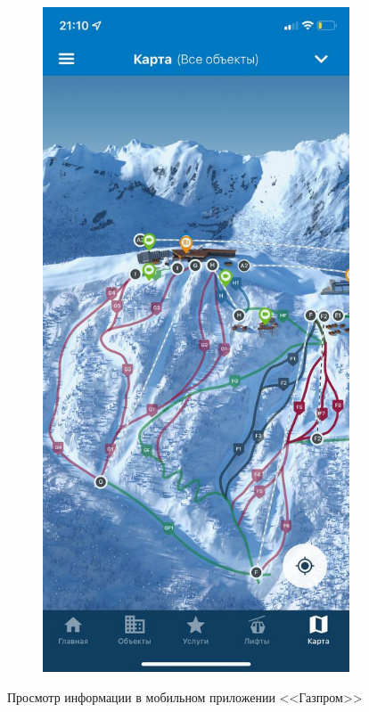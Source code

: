 \begin{figure}[h!]
\begin{center}
\begin{subfigure}{.33\textwidth}
		\label{img:glift}
		\captionsetup{justification=centering}
		\caption{}
	\end{subfigure}%
	\begin{subfigure}{.33\textwidth}
		\centering
		\includegraphics[width=.95\linewidth]{../imgs/analogue_apps/gmap.png}
		\label{img:gmap}
		\captionsetup{justification=centering}
		\caption{}
	\end{subfigure}
	\captionsetup{justification=centering}
	\caption{Просмотр информации в мобильном приложении <<Газпром>>}
	\label{img:g}
	\end{center}
\end{figure}


